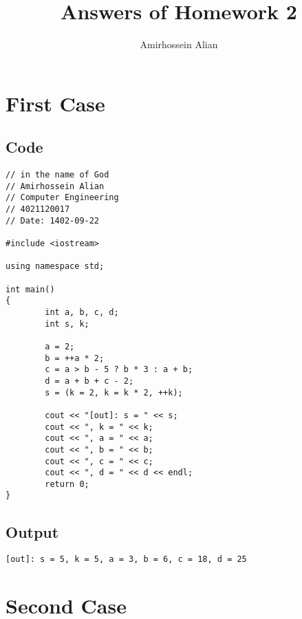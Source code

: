\documentclass[12pt]{article}
\title{Answers of Homework 2}
\author{Amirhossein Alian}
\begin{document}
    \maketitle
    
	\section{First Case}
	
	\subsection{Code}
    \begin{tcolorbox}[breakable, size=fbox, boxrule=1pt, pad at break*=1mm,colback=cellbackground, colframe=cellborder]
\begin{verbatim}
// in the name of God
// Amirhossein Alian
// Computer Engineering
// 4021120017
// Date: 1402-09-22

#include <iostream>

using namespace std;

int main()
{
        int a, b, c, d;
        int s, k;

        a = 2;
        b = ++a * 2;
        c = a > b - 5 ? b * 3 : a + b;
        d = a + b + c - 2;
        s = (k = 2, k = k * 2, ++k);

        cout << "[out]: s = " << s;
        cout << ", k = " << k;
        cout << ", a = " << a;
        cout << ", b = " << b;
        cout << ", c = " << c;
        cout << ", d = " << d << endl;
        return 0;
}
\end{verbatim}
\end{tcolorbox}

	\subsection{Output}
    \begin{tcolorbox}[breakable, size=fbox, boxrule=1pt, pad at break*=1mm,colback=cellbackground, colframe=cellborder]

\begin{Verbatim}[commandchars=\\\{\}]
[out]: s = 5, k = 5, a = 3, b = 6, c = 18, d = 25
\end{Verbatim}
\end{tcolorbox}
\pagebreak

        \section{Second Case}
	
\end{document}
